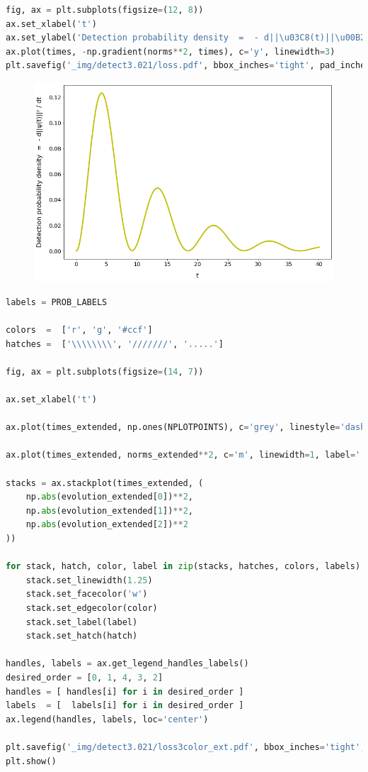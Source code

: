 \begin{lstlisting}[language=Python]
fig, ax = plt.subplots(figsize=(12, 8))
ax.set_xlabel('t')
ax.set_ylabel('Detection probability density  =  - d||\u03C8(t)||\u00B2 / dt')
ax.plot(times, -np.gradient(norms**2, times), c='y', linewidth=3)
plt.savefig('_img/detect3.021/loss.pdf', bbox_inches='tight', pad_inches=0)
\end{lstlisting}

\begin{figure}[h!]
\centering
\includegraphics[width=0.66\linewidth]{tex/appendix/nb/jupyter/3lev/output_39_0.png}

\end{figure}

\begin{lstlisting}[language=Python]
labels = PROB_LABELS

colors  =  ['r', 'g', '#ccf']
hatches =  ['\\\\\\\\', '///////', '.....']

fig, ax = plt.subplots(figsize=(14, 7))

ax.set_xlabel('t')

ax.plot(times_extended, np.ones(NPLOTPOINTS), c='grey', linestyle='dashed', label='Initial norm')

ax.plot(times_extended, norms_extended**2, c='m', linewidth=1, label='||\u03C8(t)||\u00B2')

stacks = ax.stackplot(times_extended, (
    np.abs(evolution_extended[0])**2,
    np.abs(evolution_extended[1])**2,
    np.abs(evolution_extended[2])**2
))

for stack, hatch, color, label in zip(stacks, hatches, colors, labels):
    stack.set_linewidth(1.25)
    stack.set_facecolor('w')
    stack.set_edgecolor(color)
    stack.set_label(label)
    stack.set_hatch(hatch)

handles, labels = ax.get_legend_handles_labels()
desired_order = [0, 1, 4, 3, 2]
handles = [ handles[i] for i in desired_order ]
labels  = [  labels[i] for i in desired_order ]
ax.legend(handles, labels, loc='center')

plt.savefig('_img/detect3.021/loss3color_ext.pdf', bbox_inches='tight', pad_inches=0)
plt.show()
\end{lstlisting}


